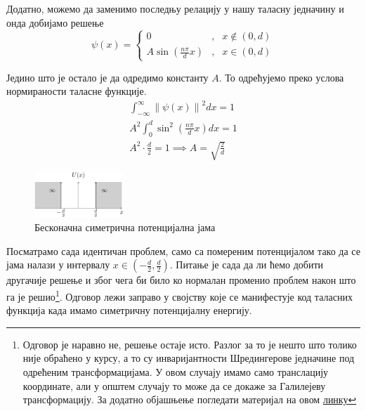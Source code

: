 \documentclass{tufte-handout} %
\theoremstyle{definition}
\theoremstyle{remark}
\newcommand{\norm}[1]{\left\lVert #1 \right\rVert}
\begin{document}
Додатно, можемо да заменимо последњу релацију у нашу таласну једначину и онда добијамо решење
\begin{equation}
	\psi(x) = \left\{ \begin{array}{rcl}
		0 & \mbox{,}
		& x\notin(0,d) \\ 
		A\sin(\frac{n\pi}{d}x) & \mbox{,} & x\in(0,d)
	\end{array}\right.
\end{equation}\par
Једино што је остало је да одредимо константу $A$. То одрећујемо преко услова нормираности таласне функције.
\begin{align*}
	\int_{-\infty}^{\infty}\norm{\psi(x)}^2dx=1\\
	A^2\int_{0}^{d}\sin^2(\frac{n\pi}{d}x)dx=1\\
	A^2\cdot\frac{d}{2}=1\implies A=\sqrt{\frac{2}{d}}
\end{align*}\par
\begin{figure}
	\centering
	\label{fig:beskonacna_simetricna_jama}\includegraphics[width=0.3\textwidth]{beskonacna_jama.png}
	\caption{Бесконачна симетрична потенцијална јама}
\end{figure}
Посматрамо сада идентичан проблем, само са помереним потенцијалом тако да се јама налази у интервалу $x\in(-\frac{d}{2},\frac{d}{2})$. Питање је сада да ли ћемо добити другачије решење и због чега би било ко нормалан променио проблем након што га је решио\footnote{Одговор је наравно не, решење остаје исто. Разлог за то је нешто што толико није обраћено у курсу, а то су инваријантности Шредингерове једначине под одрећеним трансформацијама. У овом случају имамо само транслацију координате, али у општем случају то може да се докаже за Галилејеву трансформацију. За додатно објашњење погледати материјал на овом  \href{https://en.wikipedia.org/wiki/User:Likebox/Schrodinger\#Galilean_invariance}{линку}}. Одговор лежи заправо у својству које се манифестује код таласних функција када имамо симетричну потенцијалну енергију.
\end{document}
